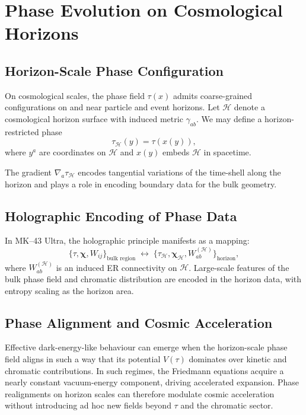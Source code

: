 \chapter{Phase Evolution on Cosmological Horizons}

\section{Horizon-Scale Phase Configuration}

On cosmological scales, the phase field $\tau(x)$ admits coarse-grained configurations on and near particle and event horizons.
Let $\mathcal{H}$ denote a cosmological horizon surface with induced metric $\gamma_{ab}$.
We may define a horizon-restricted phase
\[
  \tau_{\mathcal{H}}(y) = \tau(x(y)),
\]
where $y^a$ are coordinates on $\mathcal{H}$ and $x(y)$ embeds $\mathcal{H}$ in spacetime.

The gradient $\nabla_a \tau_{\mathcal{H}}$ encodes tangential variations of the time-shell along the horizon and plays a role in encoding boundary data for the bulk geometry.

\section{Holographic Encoding of Phase Data}

In MK--43 Ultra, the holographic principle manifests as a mapping:
\[
  \{\tau,\bm{\chi},W_{ij}\}_{\text{bulk region}} \;\longleftrightarrow\;
  \{\tau_{\mathcal{H}},\bm{\chi}_{\mathcal{H}},W_{ab}^{(\mathcal{H})}\}_{\text{horizon}},
\]
where $W_{ab}^{(\mathcal{H})}$ is an induced ER connectivity on $\mathcal{H}$.
Large-scale features of the bulk phase field and chromatic distribution are encoded in the horizon data, with entropy scaling as the horizon area.

\section{Phase Alignment and Cosmic Acceleration}

Effective dark-energy-like behaviour can emerge when the horizon-scale phase field aligns in such a way that its potential $V(\tau)$ dominates over kinetic and chromatic contributions.
In such regimes, the Friedmann equations acquire a nearly constant vacuum-energy component, driving accelerated expansion.
Phase realignments on horizon scales can therefore modulate cosmic acceleration without introducing ad hoc new fields beyond $\tau$ and the chromatic sector.

